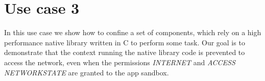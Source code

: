 \section{Use case 3}\label{appendix:seapp_uc3}

In this use case we show how to confine a set of components, which
rely on a high performance native library written in C to perform some
task. Our goal is to demonstrate that the context running the native
library code is prevented to access the network, even when the
permissions {\em INTERNET} and {\em ACCESS\textunderscore
  NETWORK\textunderscore STATE} are granted to the app sandbox.

\begin{figure}[h]
  \centering
  \hfill
  \hfill

\end{figure}
